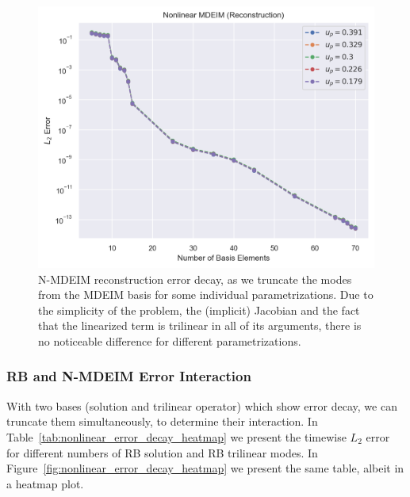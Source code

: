 \documentclass[../../thesis.tex]{subfiles}
\begin{document}
\begin{figure}[h]
    \centering
    \includegraphics[width=1\columnwidth]{research_project/piston/figures/mdeim_certification/nonlinear_error_decay_by_parameter.png}
    \caption{N-MDEIM reconstruction error decay, 
    as we truncate the modes from the MDEIM basis for some individual parametrizations.
    Due to the simplicity of the problem, 
    the (implicit) Jacobian and 
    the fact that the linearized term is trilinear in all of its arguments, 
    there is no noticeable difference for different parametrizations.}
    \label{fig:nonlinear_error_decay_from_fom_by_parameter}
\end{figure}


\subsubsection{RB and N-MDEIM Error Interaction}
\label{sec:reduced_basis_mdeim_error_interaction}
With two bases (solution and trilinear operator) which show error decay, 
we can truncate them simultaneously, 
to determine their interaction.
In Table~\ref{tab:nonlinear_error_decay_heatmap} we present 
the timewise $L_2$ error for different numbers of RB solution 
and RB trilinear modes.
In Figure~\ref{fig:nonlinear_error_decay_heatmap} we present the same table,
albeit in a heatmap plot. 
\end{document}
